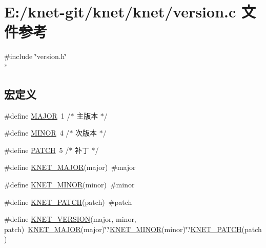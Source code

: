 \hypertarget{a00097}{}\section{E\+:/knet-\/git/knet/knet/version.c 文件参考}
\label{a00097}
{\ttfamily \#include \char`\"{}version.\+h\char`\"{}}\\*
\subsection*{宏定义}
\begin{DoxyCompactItemize}
\item 
\#define \hyperlink{a00097_a877cce34f3e58fd7f9194fab90724cb8_a877cce34f3e58fd7f9194fab90724cb8}{M\+A\+J\+O\+R}~1 /$\ast$ 主版本 $\ast$/
\item 
\#define \hyperlink{a00097_a4e10915d93013542d442d78de0e02e9a_a4e10915d93013542d442d78de0e02e9a}{M\+I\+N\+O\+R}~4 /$\ast$ 次版本 $\ast$/
\item 
\#define \hyperlink{a00097_af59c44c1f3ff875c35393428624473aa_af59c44c1f3ff875c35393428624473aa}{P\+A\+T\+C\+H}~5 /$\ast$ 补丁 $\ast$/
\item 
\#define \hyperlink{a00097_ad4c134c968cc4fc0cc700567eb39c675_ad4c134c968cc4fc0cc700567eb39c675}{K\+N\+E\+T\+\_\+\+M\+A\+J\+O\+R}(major)~\#major
\item 
\#define \hyperlink{a00097_a70224fafcaea5102f9cd726ba926684f_a70224fafcaea5102f9cd726ba926684f}{K\+N\+E\+T\+\_\+\+M\+I\+N\+O\+R}(minor)~\#minor
\item 
\#define \hyperlink{a00097_ae9af7a95a483a187a37d3e9828c6ac1c_ae9af7a95a483a187a37d3e9828c6ac1c}{K\+N\+E\+T\+\_\+\+P\+A\+T\+C\+H}(patch)~\#patch
\item 
\#define \hyperlink{a00097_a96eb274e34ccfa0c0505ca99f2e09a82_a96eb274e34ccfa0c0505ca99f2e09a82}{K\+N\+E\+T\+\_\+\+V\+E\+R\+S\+I\+O\+N}(major,  minor,  patch)~\hyperlink{a00097_ad4c134c968cc4fc0cc700567eb39c675_ad4c134c968cc4fc0cc700567eb39c675}{K\+N\+E\+T\+\_\+\+M\+A\+J\+O\+R}(major)\char`\"{}.\char`\"{}\hyperlink{a00097_a70224fafcaea5102f9cd726ba926684f_a70224fafcaea5102f9cd726ba926684f}{K\+N\+E\+T\+\_\+\+M\+I\+N\+O\+R}(minor)\char`\"{}.\char`\"{}\hyperlink{a00097_ae9af7a95a483a187a37d3e9828c6ac1c_ae9af7a95a483a187a37d3e9828c6ac1c}{K\+N\+E\+T\+\_\+\+P\+A\+T\+C\+H}(patch)
\end{DoxyCompactItemize}
